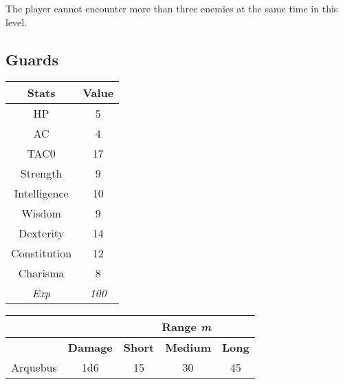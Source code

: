 The player cannot encounter more than three enemies at the same time in this level.

\subsection{Guards}
\begin{table}[H]
  \centering
\begin{tabular}{|c|c|}
\hline
\rowcolor[HTML]{C0C0C0}
\textbf{Stats} & \textbf{Value } \\ \hline
HP & 5 \\ \hline
AC & 4 \\ \hline
TAC0 & 17 \\ \hline
Strength & 9  \\ \hline
Intelligence & 10 \\ \hline
Wisdom & 9 \\ \hline
Dexterity & 14 \\ \hline
Constitution & 12 \\ \hline
Charisma & 8 \\ \hline
\textit{Exp} & \textit{100} \\ \hline
\end{tabular}
\end{table}
\begin{table}[H]
  \centering
  \begin{tabular}{ll|c|c|c|}
    \cline{3-5}
     &  & \multicolumn{3}{c|}{\cellcolor[HTML]{C0C0C0}\textbf{Range \textit{m}}} \\ \hline
    \rowcolor[HTML]{C0C0C0}
    \multicolumn{1}{|l|}{\cellcolor[HTML]{C0C0C0}\textbf{Weapon}} & \textbf{Damage} & \multicolumn{1}{l|}{\cellcolor[HTML]{C0C0C0}\textbf{Short}} & \textbf{Medium} & \textbf{Long} \\ \hline
    \multicolumn{1}{|c|}{Arquebus} & \multicolumn{1}{c|}{1d6} & 15 & 30 & 45 \\ \hline
  \end{tabular}
\end{table}

